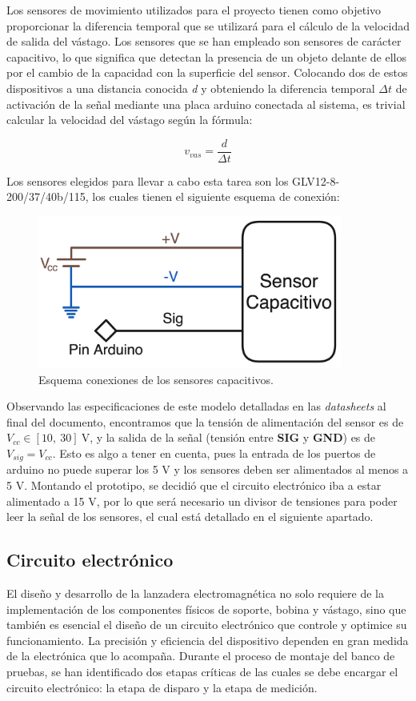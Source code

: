 Los sensores de movimiento utilizados para el proyecto tienen como objetivo proporcionar la diferencia temporal que se utilizará para el cálculo de la velocidad de salida del vástago. Los sensores que se han empleado son sensores de carácter capacitivo, lo que significa que detectan la presencia de un objeto delante de ellos por el cambio de la capacidad con la superficie del sensor. Colocando dos de estos dispositivos a una distancia conocida \textit{d} y obteniendo la diferencia temporal \(\Delta t\) de activación de la señal mediante una placa arduino conectada al sistema, es trivial calcular la velocidad del vástago según la fórmula:

\[v_{vas}=\frac{d}{\Delta t}\]

Los sensores elegidos para llevar a cabo esta tarea son los GLV12-8-200/37/40b/115, los cuales tienen el siguiente esquema de conexión:

\begin{figure}[H]
    \centering
    \includegraphics[width=10cm]{FigurasMemoria/esquemaSensor.png}
    \caption{Esquema conexiones de los sensores capacitivos.}
    \label{fig:esquemaSensor} %
\end{figure}

Observando las especificaciones de este modelo detalladas en las \textit{datasheets} al final del documento, encontramos que la tensión de alimentación del sensor es de \(V_{cc}\in [10,~30]~\text{V}\), y la salida de la señal (tensión entre \textbf{SIG} y \textbf{GND}) es de \(V_{sig}=V_{cc}\). Esto es algo a tener en cuenta, pues la entrada de los puertos de arduino no puede superar los 5 V y los sensores deben ser alimentados al menos a 5 V. Montando el prototipo, se decidió que el circuito electrónico iba a estar alimentado a 15 V, por lo que será necesario un divisor de tensiones para poder leer la señal de los sensores, el cual está detallado en el siguiente apartado.

\subsection{Circuito electrónico}
\label{subsec:circuito}
El diseño y desarrollo de la lanzadera electromagnética no solo requiere de la implementación de los componentes físicos de soporte, bobina y vástago, sino que también es esencial el diseño de un circuito electrónico que controle y optimice su funcionamiento. La precisión y eficiencia del dispositivo dependen en gran medida de la electrónica que lo acompaña. Durante el proceso de montaje del banco de pruebas, se han identificado dos etapas críticas de las cuales se debe encargar el circuito electrónico: la etapa de disparo y la etapa de medición.

